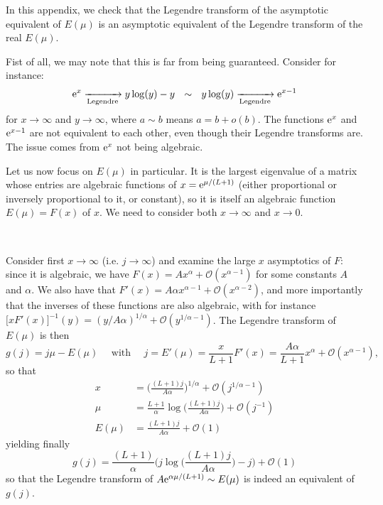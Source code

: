 \documentclass[aps,pre,onecolumn,showpacs,showkeys,a4paper]{revtex4-1}
\begin{document}
In this appendix, we check that the Legendre transform of the asymptotic equivalent of $E(\mu)$ is an asymptotic equivalent of the Legendre transform of the real $E(\mu)$.

Fist of all, we may note that this is far from being guaranteed. Consider for instance:
\begin{equation}
{\rm e}^{x}\xrightarrow[{\rm Legendre}]{}y\log(y)-y~~\sim~~ y\log(y)\xrightarrow[{\rm Legendre}]{}{\rm e}^{x-1}
\end{equation}
for $x\rightarrow\infty$ and $y\rightarrow\infty$, where $a\sim b$ means $a=b+o(b)$. The functions ${\rm e}^{x}$ and ${\rm e}^{x-1}$ are not equivalent to each other, even though their Legendre transforms are. The issue comes from ${\rm e}^{x}$ not being algebraic.

Let us now focus on $E(\mu)$ in particular. It is the largest eigenvalue of a matrix whose entries are algebraic functions of $x={\rm e}^{\mu/(L+1)}$ (either proportional or inversely proportional to it, or constant), so it is itself an algebraic function $E(\mu)=F(x)$ of $x$. We need to consider both $x\rightarrow\infty$ and $x\rightarrow 0$.

~~

Consider first $x\rightarrow\infty$ (i.e. $j\rightarrow\infty$) and examine the large $x$ asymptotics of $F$: since it is algebraic, we have $F(x)= Ax^{\alpha}+\mathcal{O}(x^{\alpha-1})$ for some constants $A$ and $\alpha$. We also have that $F'(x)= A\alpha x^{\alpha-1}+\mathcal{O}(x^{\alpha-2})$, and more importantly that the inverses of these functions are also algebraic, with for instance $\bigl[xF'(x)\bigr]^{-1}(y)=(y/A\alpha)^{1/\alpha}+\mathcal{O}(y^{1/\alpha-1})$. The Legendre transform of $E(\mu)$ is then
\begin{equation}
g(j)=j\mu-E(\mu)~~~~~~\mathrm{with}~~~~~~ j=E'(\mu)=\frac{x}{L+1}F'(x)= \frac{A\alpha}{L+1} x^{\alpha}+\mathcal{O}(x^{\alpha-1}),
\end{equation}
so that
\begin{align}
x&= \biggl(\frac{(L+1)j}{A\alpha}\biggr)^{1/\alpha}+\mathcal{O}(j^{1/\alpha-1})\\
\mu&=\frac{L+1}{\alpha}\log\biggl(\frac{(L+1)j}{A\alpha}\biggr)+\mathcal{O}(j^{-1})\\
E(\mu)&=\frac{(L+1)j}{A\alpha}+\mathcal{O}(1)
\end{align}
yielding finally
\begin{equation}
g(j)= \frac{(L+1)}{\alpha}\Biggl(j\log\biggl(\frac{(L+1)j}{A\alpha}\biggr)-j\Biggr)+\mathcal{O}(1)
\end{equation}
so that the Legendre transform of $A{\rm e}^{\alpha\mu/(L+1)}\sim E(\mu)$ is indeed an equivalent of $g(j)$.
\end{document}
